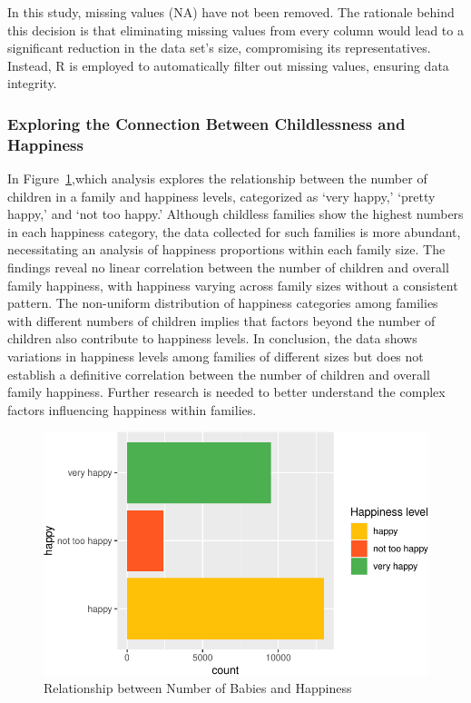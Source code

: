 \documentclass[
  letterpaper,
  DIV=11,
  numbers=noendperiod]{scrartcl}
\begin{document}
In this study, missing values (NA) have not been removed. The rationale
behind this decision is that eliminating missing values from every
column would lead to a significant reduction in the data set's size,
compromising its representatives. Instead, R is employed to
automatically filter out missing values, ensuring data integrity.

\hypertarget{exploring-the-connection-between-childlessness-and-happiness}{%
\subsubsection{Exploring the Connection Between Childlessness and
Happiness}\label{exploring-the-connection-between-childlessness-and-happiness}}

In Figure~\ref{fig-one},which analysis explores the relationship between
the number of children in a family and happiness levels, categorized as
`very happy,' `pretty happy,' and `not too happy.' Although childless
families show the highest numbers in each happiness category, the data
collected for such families is more abundant, necessitating an analysis
of happiness proportions within each family size. The findings reveal no
linear correlation between the number of children and overall family
happiness, with happiness varying across family sizes without a
consistent pattern. The non-uniform distribution of happiness categories
among families with different numbers of children implies that factors
beyond the number of children also contribute to happiness levels. In
conclusion, the data shows variations in happiness levels among families
of different sizes but does not establish a definitive correlation
between the number of children and overall family happiness. Further
research is needed to better understand the complex factors influencing
happiness within families.

\begin{figure}

{\centering \includegraphics{paper_files/figure-pdf/fig-one-1.pdf}

}

\caption{\label{fig-one}Relationship between Number of Babies and
Happiness}

\end{figure}
\end{document}

